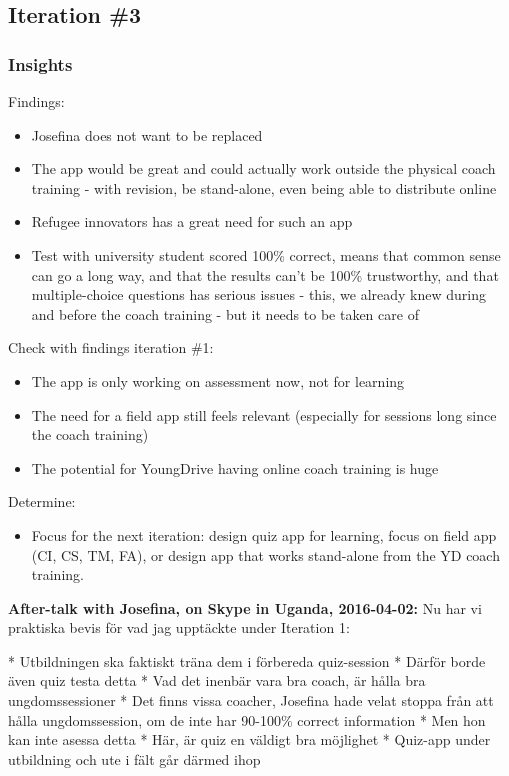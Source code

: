 \subsection{Iteration \#3}

\subsubsection*{Insights}

Findings:
\begin{itemize}
	\item Josefina does not want to be replaced
    \item The app would be great and could actually work outside the physical coach training - with revision, be stand-alone, even being able to distribute online
    \item Refugee innovators has a great need for such an app
    \item Test with university student scored 100\% correct, means that common sense can go a long way, and that the results can't be 100\% trustworthy, and that multiple-choice questions has serious issues - this, we already knew during and before the coach training - but it needs to be taken care of
\end{itemize}

Check with findings iteration \#1:

\begin{itemize}
\item The app is only working on assessment now, not for learning
\item The need for a field app still feels relevant (especially for sessions long since the coach training)
\item The potential for YoungDrive having online coach training is huge
\end{itemize}

Determine:
\begin{itemize}
	\item Focus for the next iteration: design quiz app for learning, focus on field app (CI, CS, TM, FA), or design app that works stand-alone from the YD coach training.
\end{itemize}

\textbf{After-talk with Josefina, on Skype in Uganda, 2016-04-02:}
Nu har vi praktiska bevis för vad jag upptäckte under Iteration 1:

* Utbildningen ska faktiskt träna dem i förbereda quiz-session
* Därför borde även quiz testa detta
* Vad det inenbär vara bra coach, är hålla bra ungdomssessioner
* Det finns vissa coacher, Josefina hade velat stoppa från att hålla ungdomssession, om de inte har 90-100\% correct information
* Men hon kan inte asessa detta
* Här, är quiz en väldigt bra möjlighet
* Quiz-app under utbildning och ute i fält går därmed ihop



